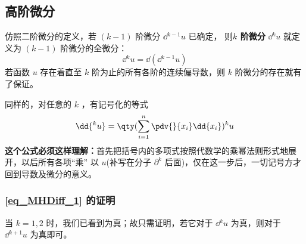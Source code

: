 \subsection{高阶微分}
仿照二阶微分的定义，若 $(k-1)$ 阶微分 $\dd{^{k-1}}u$ 已确定， 则\textbf{$k$ 阶微分} $\dd{^ku}$ 就定义为 $(k-1)$ 阶微分的全微分：
\begin{equation}
\dd{^k u}=\dd{(\dd{^{k-1}}u)}
\end{equation}
若函数 $u$ 存在着直至 $k$ 阶为止的所有各阶的连续偏导数，则 $k$ 阶微分的存在就有了保证。

 同样的，对任意的 $k$ ，有记号化的等式
 \begin{equation}\label{eq_MHDiff_1}
 \dd{^ku}=\qty(\sum_{i=1}^n\pdv{}{x_i}\dd{x_i})^k u
 \end{equation}
 \textbf{这个公式必须这样理解：}首先把括号内的多项式按照代数学的乘幂法则形式地展开，以后所有各项“乘” 以 $u$(补写在分子 $\partial^k$ 后面)，仅在这一步后，一切记号方才回到导数及微分的意义。
 \subsubsection{\autoref{eq_MHDiff_1} 的证明}
 当 $k=1,2$ 时，我们已看到为真；故只需证明，若它对于 $\dd{^k u}$ 为真，则对于 $\dd{^{k+1}u}$ 为真即可。
 
